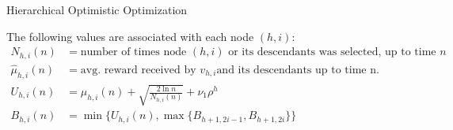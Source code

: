\begin{algorithm}
  \caption{Hierarchical Optimistic Optimization}\label{alg:hooShort}
\end{algorithm}


The following values are associated with each node $(h,i)$:
\begin{align*}
  N_{h,i}(n) &= \text{number of times node } (h,i) \text{ or its
    descendants was selected, up to time } n\\ 
  \hat{\mu}_{h,i}(n) &= \text{avg. reward received by } v_{h,i} \text{
    and its descendants up to time n.}\\
  U_{h,i}(n) &= \hat{\mu}_{h,i}(n) + \sqrt{\frac{2 \ln n}{N_{h,i}(n)}}
  + \nu_1 \rho^h\\
  B_{h,i}(n) &= \min\{ U_{h,i}(n), \max\{ B_{h+1,2i-1}, B_{h+1,2i}\} \}
\end{align*}

